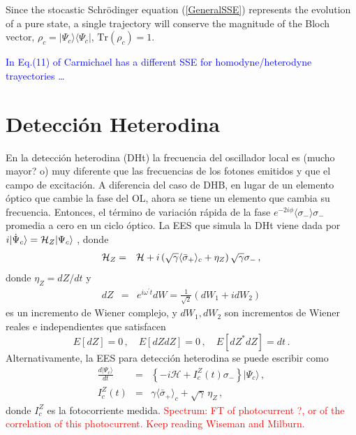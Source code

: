 \documentclass[twocolumn,aps,eqsecnum,showkeys,amsmath]{revtex4}
\newcommand{\mcH}{\mathcal{H}} 	%
\newcommand{\Tr}{\mathrm{Tr}}
\providecommand{\vxp}[1]{\langle #1 \rangle}
\providecommand{\ket}[1]{\lvert #1 \rangle}
\begin{document}
Since the stocastic Schr\"odinger equation (\ref{GeneralSSE}) represents 
the evolution of a pure state, a single trajectory will conserve the magnitude 
of the Bloch vector, $\rho_c= |\Psi_c \rangle \langle \Psi_c|$, $\Tr (\rho_c)=1$.

\textcolor{blue}{In Eq.(11) of \cite{Carm96} Carmichael  has a different 
SSE for homodyne/heterodyne trayectories \ldots }

\section{Detecci\'on Heterodina }
En la detecci\'on heterodina (DHt) la frecuencia del oscillador local es 
(mucho mayor? o) muy diferente que las frecuencias de los fotones 
emitidos y que el campo de excitaci\'on. A diferencia del caso de DHB, 
en lugar de un elemento \'optico que cambie la fase del OL, ahora se 
tiene un elemento que cambia su frecuencia. Entonces, el t\'ermino de 
variaci\'on r\'apida de la fase $e^{-2i\phi} \vxp{\sigma_-} \sigma_-$ 
promedia a cero en un ciclo \'optico. La EES que simula la DHt viene 
dada por $i \ket{\dot{\Psi}_c} ={\cal H}_Z \ket{\Psi_c}$ \cite{WiMi93b}, 
donde  
%
\begin{eqnarray} 	%
{\cal H}_Z &=& {\cal H} +i\left(\sqrt{\gamma} \vxp{\bar{\sigma}_+}_c 
	+\eta_Z \right) \sqrt{\gamma} \sigma_- \,, 
\end{eqnarray}
donde $\eta_Z=dZ/dt$ y  
%
\begin{eqnarray}
dZ &=& e^{i\omega^{\prime} t} dW =\frac{1}{\sqrt{2}} (dW_1 +idW_2)
\end{eqnarray}
es un incremento de Wiener complejo, y $dW_1, dW_2$ son 
incrementos de Wiener reales e independientes que satisfacen
%
\begin{equation}
E[dZ]=0 \,, \quad E[dZdZ]=0  \,, \quad E[dZ^{\ast}dZ]=dt \,.
\end{equation}
Alternativamente, la EES para detecci\'on heterodina se puede 
escribir como   
% 
\begin{eqnarray}
\frac{d \ket{\Psi_c}}{dt} 
	&=& \left\{ -i \mcH   +I_c^Z(t) \sigma_- \right\}  \ket{\Psi_c}  \,, \\
I_c^Z(t) &=& \gamma  \vxp{\bar{\sigma}_+}_c   
	+\sqrt{\gamma} \, \eta_Z	\,,	\label{HeterodyneSSE}
\end{eqnarray}
donde $I_c^Z$ es la fotocorriente medida. 
\textcolor{red}{Spectrum: FT of photocurrent ?, or of the correlation of this 
photocurrent. Keep reading Wiseman and Milburn. }
\end{document}
